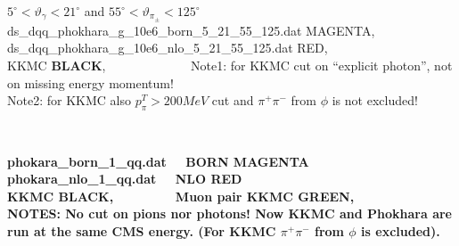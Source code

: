 \documentclass[dvips]{seminar}                      %
\begin{document}
\begin{slide}
\vspace{-3mm}
{\footnotesize
  $5^\circ<\vartheta_\gamma <21^\circ $ and $55^\circ<\vartheta_{\pi_{\pm}} <125^\circ $\\
  ds\_dqq\_phokhara\_g\_10e6\_born\_5\_21\_55\_125.dat  {\cmg MAGENTA}, \\
  ds\_dqq\_phokhara\_g\_10e6\_nlo\_5\_21\_55\_125.dat   {\crd RED},\\
  KKMC {\bf BLACK},~~~~~~~~~~~~~
  Note1: for KKMC cut on ``explicit photon'', not on missing energy momentum!\\
  Note2: for KKMC also $p^T_\pi>200MeV$ cut and $\pi^+\pi^-$ from $\phi$ is not excluded!
}
\vfill
\end{slide}    %



\begin{slide}
\vspace{-3mm}
\\
\vfill
\end{slide}    %


\begin{slide}
\vspace{-3mm}
\begin{center}
\end{center}
\vspace{-2mm}
{\footnotesize\bf
  phokara\_born\_1\_qq.dat~~ {\cmg BORN MAGENTA} \\
  phokara\_nlo\_1\_qq.dat~~  {\red NLO RED} \\
  KKMC {\bf BLACK}, ~~~~~~~~Muon pair KKMC {\cgr GREEN},\\
  NOTES:  No cut on pions nor photons!
  Now KKMC and Phokhara are run at the same CMS energy.
  (For KKMC $\pi^+\pi^-$ from $\phi$ is excluded).
}
\vfill
\end{slide}    %
\end{document}
